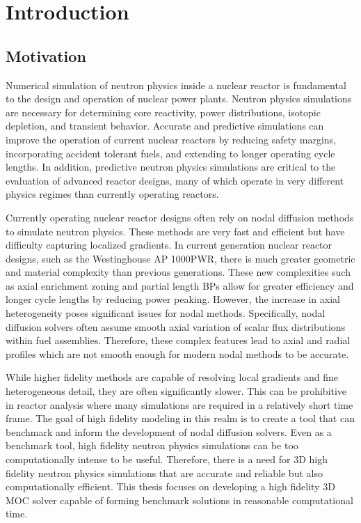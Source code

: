\chapter{Introduction}
\label{chap:intro}

\section{Motivation}
\label{sec:chap1-motivation}


Numerical simulation of neutron physics inside a nuclear reactor is fundamental to the design and operation of nuclear power plants. Neutron physics simulations are necessary for determining core reactivity, power distributions, isotopic depletion, and transient behavior. Accurate and predictive simulations can improve the operation of current nuclear reactors by reducing safety margins, incorporating accident tolerant fuels, and extending to longer operating cycle lengths. In addition, predictive neutron physics simulations are critical to the evaluation of advanced reactor designs, many of which operate in very different physics regimes than currently operating reactors. 

Currently operating nuclear reactor designs often rely on nodal diffusion methods to simulate neutron physics. These methods are very fast and efficient but have difficulty capturing localized gradients. In current generation nuclear reactor designs, such as the Westinghouse AP 1000\texttrademark \ac{PWR}, there is much greater geometric and material complexity than previous generations. These new complexities such as axial enrichment zoning and partial length \ac{BP}s allow for greater efficiency and longer cycle lengths by reducing power peaking. However, the increase in axial heterogeneity poses significant issues for nodal methods. Specifically, nodal diffusion solvers often assume smooth axial variation of scalar flux distributions within fuel assemblies. Therefore, these complex features  lead to axial and radial profiles which are not smooth enough for modern nodal methods to be accurate.

While higher fidelity methods are capable of resolving local gradients and fine heterogeneous detail, they are often significantly slower. This can be prohibitive in reactor analysis where many simulations are required in a relatively short time frame. The goal of high fidelity modeling in this realm is to create a tool that can benchmark and inform the development of nodal diffusion solvers. Even as a benchmark tool, high fidelity neutron physics simulations can be too computationally intense to be useful. Therefore, there is a need for 3D high fidelity neutron physics simulations that are accurate and reliable but also computationally efficient. This thesis focuses on developing a high fidelity 3D \ac{MOC} solver capable of forming benchmark solutions in reasonable computational time.

